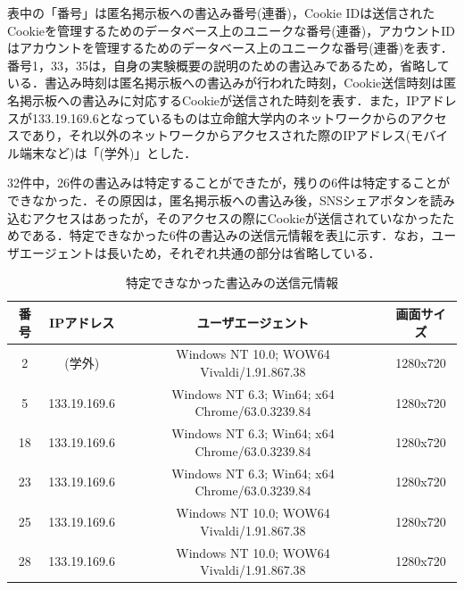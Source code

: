 \documentclass[10pt, a4paper]{jreport}
\begin{document}

表中の「番号」は匿名掲示板への書込み番号(連番)，Cookie IDは送信されたCookieを管理するためのデータベース上のユニークな番号(連番)，アカウントIDはアカウントを管理するためのデータベース上のユニークな番号(連番)を表す．番号1，33，35は，自身の実験概要の説明のための書込みであるため，省略している．書込み時刻は匿名掲示板への書込みが行われた時刻，Cookie送信時刻は匿名掲示板への書込みに対応するCookieが送信された時刻を表す．また，IPアドレスが133.19.169.6となっているものは立命館大学内のネットワークからのアクセスであり，それ以外のネットワークからアクセスされた際のIPアドレス(モバイル端末など)は「(学外)」とした．

32件中，26件の書込みは特定することができたが，残りの6件は特定することができなかった．その原因は，匿名掲示板への書込み後，SNSシェアボタンを読み込むアクセスはあったが，そのアクセスの際にCookieが送信されていなかったためである．特定できなかった6件の書込みの送信元情報を表\ref{tb: exp_result_untracked}に示す．なお，ユーザエージェントは長いため，それぞれ共通の部分は省略している．

\begin{table}[H]
	\caption{特定できなかった書込みの送信元情報}
	\label{tb: exp_result_untracked}
	\begin{center}
		\scalebox{0.85} {
			\begin{tabular}{ | c | c | c | c | } \hline

番号 & IPアドレス & ユーザエージェント & 画面サイズ \\ \hline
2 & (学外) & Windows NT 10.0; WOW64 Vivaldi/1.91.867.38 & 1280x720 \\ \hline
5 & 133.19.169.6 & Windows NT 6.3; Win64; x64 Chrome/63.0.3239.84 & 1280x720 \\ \hline
18 & 133.19.169.6 & Windows NT 6.3; Win64; x64 Chrome/63.0.3239.84 & 1280x720 \\ \hline
23 & 133.19.169.6 & Windows NT 6.3; Win64; x64 Chrome/63.0.3239.84 & 1280x720 \\ \hline
25 & 133.19.169.6 & Windows NT 10.0; WOW64 Vivaldi/1.91.867.38 & 1280x720 \\ \hline
28 & 133.19.169.6 & Windows NT 10.0; WOW64 Vivaldi/1.91.867.38 & 1280x720 \\ \hline

			\end{tabular}
		}
	\end{center}
\end{table}
\end{document}
